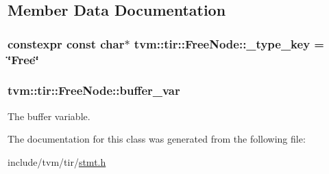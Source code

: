 \subsection{Member Data Documentation}
\subsubsection[{\texorpdfstring{\+\_\+type\+\_\+key}{_type_key}}]{\setlength{\rightskip}{0pt plus 5cm}constexpr const char$\ast$ tvm\+::tir\+::\+Free\+Node\+::\+\_\+type\+\_\+key = \char`\"{}Free\char`\"{}\hspace{0.3cm}{\ttfamily [static]}}\hypertarget{classtvm_1_1tir_1_1FreeNode_aa559f13505dd71354ccfd24b3a584f6f}{}\label{classtvm_1_1tir_1_1FreeNode_aa559f13505dd71354ccfd24b3a584f6f}
\subsubsection[{\texorpdfstring{buffer\+\_\+var}{buffer_var}}]{ tvm\+::tir\+::\+Free\+Node\+::buffer\+\_\+var}\hypertarget{classtvm_1_1tir_1_1FreeNode_aa7b2c65857d55fb7da6a1fa4935b48fe}{}\label{classtvm_1_1tir_1_1FreeNode_aa7b2c65857d55fb7da6a1fa4935b48fe}


The buffer variable. 



The documentation for this class was generated from the following file\+:\begin{DoxyCompactItemize}
\item 
include/tvm/tir/\hyperlink{stmt_8h}{stmt.\+h}\end{DoxyCompactItemize}
